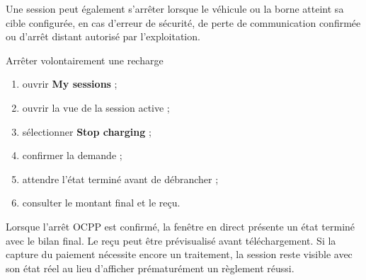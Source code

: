 Une session peut également s'arrêter lorsque le véhicule ou la borne atteint sa
cible configurée, en cas d'erreur de sécurité, de perte de communication
confirmée ou d'arrêt distant autorisé par l'exploitation.

\begin{procedurebox}{Arrêter volontairement une recharge}
  \begin{enumerate}[leftmargin=1.6em]
    \item ouvrir \textbf{My sessions} ;
    \item ouvrir la vue de la session active ;
    \item sélectionner \textbf{Stop charging} ;
    \item confirmer la demande ;
    \item attendre l'état terminé avant de débrancher ;
    \item consulter le montant final et le reçu.
  \end{enumerate}
\end{procedurebox}


Lorsque l'arrêt OCPP est confirmé, la fenêtre en direct présente un état terminé
avec le bilan final. Le reçu peut être prévisualisé avant téléchargement. Si la
capture du paiement nécessite encore un traitement, la session reste visible
avec son état réel au lieu d'afficher prématurément un règlement réussi.

